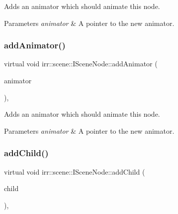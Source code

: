 Adds an animator which should animate this node. 


\begin{DoxyParams}{Parameters}
{\em animator} & A pointer to the new animator. \\
\hline
\end{DoxyParams}
\mbox{\label{classirr_1_1scene_1_1ISceneNode_a0e5cd342cd7293c136e53e2c2c5e0f3a}} 
\subsubsection{\texorpdfstring{add\+Animator()}{addAnimator()}\hspace{0.1cm}{\footnotesize\ttfamily [2/2]}}
{\footnotesize\ttfamily virtual void irr\+::scene\+::\+I\+Scene\+Node\+::add\+Animator (\begin{DoxyParamCaption}\item[{\hyperlink{classirr_1_1scene_1_1ISceneNodeAnimator}{I\+Scene\+Node\+Animator} $\ast$}]{animator }\end{DoxyParamCaption})\hspace{0.3cm}{\ttfamily [inline]}, {\ttfamily [virtual]}}



Adds an animator which should animate this node. 


\begin{DoxyParams}{Parameters}
{\em animator} & A pointer to the new animator. \\
\hline
\end{DoxyParams}
\mbox{\label{classirr_1_1scene_1_1ISceneNode_acceef4fbb68f6cc7bb40035225350970}} 
\subsubsection{\texorpdfstring{add\+Child()}{addChild()}\hspace{0.1cm}{\footnotesize\ttfamily [1/2]}}
{\footnotesize\ttfamily virtual void irr\+::scene\+::\+I\+Scene\+Node\+::add\+Child (\begin{DoxyParamCaption}\item[{\hyperlink{classirr_1_1scene_1_1ISceneNode}{I\+Scene\+Node} $\ast$}]{child }\end{DoxyParamCaption})\hspace{0.3cm}{\ttfamily [inline]}, {\ttfamily [virtual]}}



